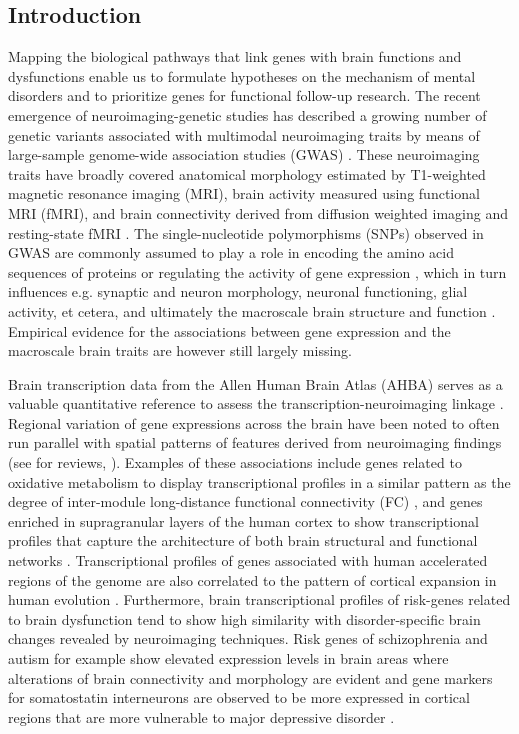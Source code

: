 \begin{refsection}
\section*{Introduction}
Mapping the biological pathways that link genes with brain functions and dysfunctions enable us to formulate hypotheses on the mechanism of mental disorders and to prioritize genes for functional follow-up research.  The recent emergence of neuroimaging-genetic studies has described a growing number of genetic variants associated with multimodal neuroimaging traits by means of large-sample genome-wide association studies (GWAS)  \citep{elliott2018genome,Satizabal2019GeneticAO,Zhao2019GenomewideAA}. These neuroimaging traits have broadly covered anatomical morphology estimated by T1-weighted magnetic resonance imaging (MRI), brain activity measured using functional MRI (fMRI), and brain connectivity derived from diffusion weighted imaging and resting-state fMRI \citep{Miller2016MultimodalPB}. The single-nucleotide polymorphisms (SNPs) observed in GWAS are commonly assumed to play a role in encoding the amino acid sequences of proteins or regulating the activity of gene expression \citep{Shastry2009SNPsIO}, which in turn influences e.g. synaptic and neuron morphology, neuronal functioning, glial activity, et cetera, and ultimately the macroscale brain structure and function  \citep{Heuvel2019MultiscaleNO}. Empirical evidence for the associations between gene expression and the macroscale brain traits are however still largely missing.

Brain transcription data from the Allen Human Brain Atlas (AHBA) serves as a valuable quantitative reference to assess the transcription-neuroimaging linkage \citep{Hawrylycz2012AnAC}. Regional variation of gene expressions across the brain have been noted to often run parallel with spatial patterns of features derived from neuroimaging findings (see for reviews, \citep{Fornito2019BridgingTG,Heuvel2019MultiscaleNO}). Examples of these associations include genes related to oxidative metabolism to display transcriptional profiles in a similar pattern as the degree of inter-module long-distance functional connectivity (FC) \citep{vertes2016gene}, and genes enriched in supragranular layers of the human cortex to show transcriptional profiles that capture the architecture of both brain structural and functional networks \citep{krienen2016transcriptional,RomeroGarcia2018StructuralCN}. Transcriptional profiles of genes associated with human accelerated regions of the genome are also correlated to the pattern of cortical expansion in human evolution \citep{Wei2019GeneticMA}. Furthermore, brain transcriptional profiles of risk-genes related to brain dysfunction tend to show high similarity with disorder-specific brain changes revealed by neuroimaging techniques. Risk genes of schizophrenia and autism for example show elevated expression levels in brain areas where alterations of brain connectivity and morphology are evident \citep{romero2019synaptic,Romme2017ConnectomeDA} and gene markers for somatostatin interneurons are observed to be more expressed in cortical regions that are more vulnerable to major depressive disorder \citep{anderson2020convergent}.


\end{refsection}
